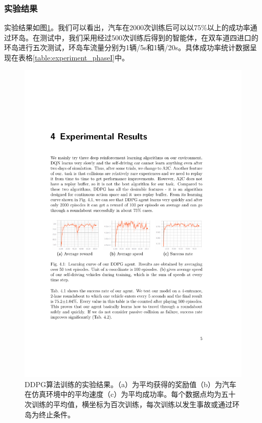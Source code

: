 \documentclass[degree=bachelor, tocarialchapter, pifootnote]{thuthesis}
\begin{document}
  \subsubsection{实验结果}
  实验结果如图\ref{fig:experiment_phaseI}。我们可以看出，汽车在2000次训练后可以以75\%以上的成功率通过环岛。在测试中，我们采用经过500次训练后得到的智能体，在双车道四进口的环岛进行五次测试，环岛车流量分别为1辆/5s和1辆/20s。具体成功率统计数据呈现在表格\ref{table:experiment_phaseI}中。\par
  \begin{figure}[H] %
        \centering
        \includegraphics[scale=1.0]{exp_result}
        \caption{DDPG算法训练的实验结果。（a）为平均获得的奖励值（b）为汽车在仿真环境中的平均速度（c）为平均成功率。每个数据点均为五十次训练的平均值，横坐标为百次训练，每次训练以发生事故或通过环岛为终止条件。}
        \label{fig:experiment_phaseI}
  \end{figure}
  
\end{document}
